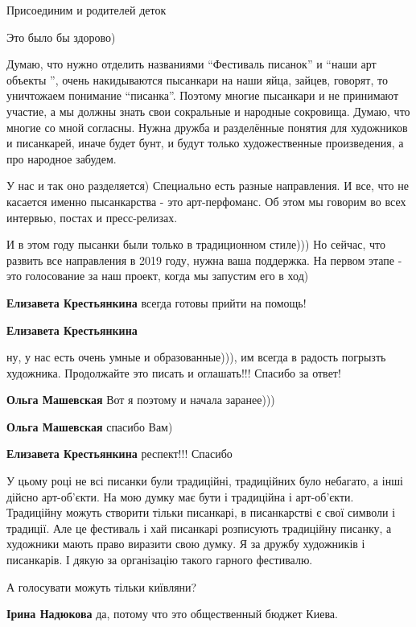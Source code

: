 Присоединим и родителей деток

\begin{itemize} %
Это было бы здорово)
\end{itemize} %


Думаю, что нужно отделить названиями \enquote{Фестиваль писанок} и \enquote{наши арт объекты
}, очень накидываются пысанкари на наши яйца, зайцев, говорят, то уничтожаем
понимание \enquote{писанка}. Поэтому многие пысанкари и не принимают участие, а мы
должны знать свои сокральные и народные сокровища. Думаю, что многие со мной
согласны. Нужна дружба и разделённые понятия для художников и писанкарей, иначе
будет бунт, и будут только художественные произведения, а про народное забудем.

\begin{itemize} %

У нас и так оно разделяется) Специально есть разные направления. И все, что не
касается именно пысанкарства - это арт-перфоманс. Об этом мы говорим во всех
интервью, постах и пресс-релизах.


И в этом году пысанки были только в традиционном стиле))) Но сейчас, что
развить все направления в 2019 году, нужна ваша поддержка. На первом этапе -
это голосование за наш проект, когда мы запустим его в ход)

\textbf{Елизавета Крестьянкина} всегда готовы прийти на помощь!

\textbf{Елизавета Крестьянкина} 

ну, у нас есть очень умные и образованные))), им всегда в радость погрызть
художника. Продолжайте это писать и оглашать!!! Спасибо за ответ!

\textbf{Ольга Машевская} Вот я поэтому и начала заранее)))

\textbf{Ольга Машевская} спасибо Вам)

\textbf{Елизавета Крестьянкина} респект!!! Спасибо


У цьому році не всі писанки були традиційні, традиційних було небагато, а інші
дійсно арт-об'єкти. На мою думку має бути і традиційна і арт-об'єкти.
Традиційну можуть створити тільки писанкарі, в писанкарстві є свої символи і
традиції. Але це фестиваль і хай писанкарі розписують традиційну писанку, а
художники мають право виразити свою думку. Я за дружбу художників і писанкарів.
І дякую за організацію такого гарного фестивалю.

А голосувати можуть тільки київляни?

\textbf{Ірина Надюкова} да, потому что это общественный бюджет Киева.

\end{itemize} %


